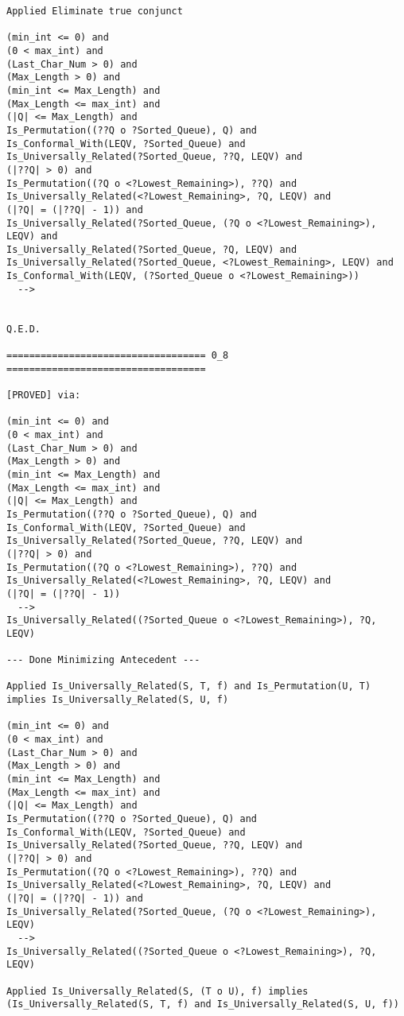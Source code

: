 \begin{lstlisting}[language=resolve]
Applied Eliminate true conjunct

(min_int <= 0) and
(0 < max_int) and
(Last_Char_Num > 0) and
(Max_Length > 0) and
(min_int <= Max_Length) and
(Max_Length <= max_int) and
(|Q| <= Max_Length) and
Is_Permutation((??Q o ?Sorted_Queue), Q) and
Is_Conformal_With(LEQV, ?Sorted_Queue) and
Is_Universally_Related(?Sorted_Queue, ??Q, LEQV) and
(|??Q| > 0) and
Is_Permutation((?Q o <?Lowest_Remaining>), ??Q) and
Is_Universally_Related(<?Lowest_Remaining>, ?Q, LEQV) and
(|?Q| = (|??Q| - 1)) and
Is_Universally_Related(?Sorted_Queue, (?Q o <?Lowest_Remaining>), LEQV) and
Is_Universally_Related(?Sorted_Queue, ?Q, LEQV) and
Is_Universally_Related(?Sorted_Queue, <?Lowest_Remaining>, LEQV) and
Is_Conformal_With(LEQV, (?Sorted_Queue o <?Lowest_Remaining>))
  -->


Q.E.D.

=================================== 0_8 ===================================

[PROVED] via:

(min_int <= 0) and
(0 < max_int) and
(Last_Char_Num > 0) and
(Max_Length > 0) and
(min_int <= Max_Length) and
(Max_Length <= max_int) and
(|Q| <= Max_Length) and
Is_Permutation((??Q o ?Sorted_Queue), Q) and
Is_Conformal_With(LEQV, ?Sorted_Queue) and
Is_Universally_Related(?Sorted_Queue, ??Q, LEQV) and
(|??Q| > 0) and
Is_Permutation((?Q o <?Lowest_Remaining>), ??Q) and
Is_Universally_Related(<?Lowest_Remaining>, ?Q, LEQV) and
(|?Q| = (|??Q| - 1))
  -->
Is_Universally_Related((?Sorted_Queue o <?Lowest_Remaining>), ?Q, LEQV)

--- Done Minimizing Antecedent ---

Applied Is_Universally_Related(S, T, f) and Is_Permutation(U, T) implies Is_Universally_Related(S, U, f)

(min_int <= 0) and
(0 < max_int) and
(Last_Char_Num > 0) and
(Max_Length > 0) and
(min_int <= Max_Length) and
(Max_Length <= max_int) and
(|Q| <= Max_Length) and
Is_Permutation((??Q o ?Sorted_Queue), Q) and
Is_Conformal_With(LEQV, ?Sorted_Queue) and
Is_Universally_Related(?Sorted_Queue, ??Q, LEQV) and
(|??Q| > 0) and
Is_Permutation((?Q o <?Lowest_Remaining>), ??Q) and
Is_Universally_Related(<?Lowest_Remaining>, ?Q, LEQV) and
(|?Q| = (|??Q| - 1)) and
Is_Universally_Related(?Sorted_Queue, (?Q o <?Lowest_Remaining>), LEQV)
  -->
Is_Universally_Related((?Sorted_Queue o <?Lowest_Remaining>), ?Q, LEQV)

Applied Is_Universally_Related(S, (T o U), f) implies (Is_Universally_Related(S, T, f) and Is_Universally_Related(S, U, f))


\end{lstlisting}

